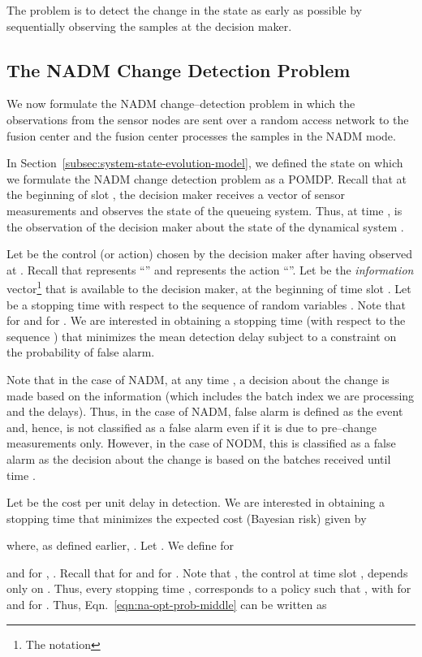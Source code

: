 \documentclass[acmtosn]{acmtrans2m}
\begin{document}
The problem is to detect the change in the state  as early as possible 
by sequentially observing the samples at the decision maker. 
\subsection{The NADM Change Detection Problem}
\label{subsec-the-NADM-change-detection-problem}
We now formulate the {\sf NADM} change--detection problem in which the observations 
from the sensor nodes are sent over a random access network to the fusion center 
and the fusion center processes the samples in the {\sf NADM} mode. 
 

In Section~\ref{subsec:system-state-evolution-model}, we defined the
state  on which we formulate
the {\sf NADM} change detection problem as a POMDP.
Recall that at the beginning of slot , the decision maker receives a vector of sensor 
measurements  and observes the state  of the queueing 
system. Thus, at time ,  is the 
observation of the decision maker about the state of the dynamical system .

Let  be the control 
(or action) chosen by the decision maker after having observed  
at . Recall that  represents ``'' and  
represents the action ``''. 
Let  be the {\em information} 
vector\footnote{The notation } 
that is available to the decision maker, at the beginning of time slot . 
Let  be a stopping time with respect to the sequence of random variables 
. 
Note that  for  and  for .
We are interested in obtaining a stopping time  (with respect to
the sequence ) that 
minimizes the mean detection delay subject to a constraint on the probability 
of false alarm. 

Note that in the case of NADM, at any time , a decision about the 
change is made based on the information  (which includes the
batch index we are processing and the delays). Thus, in the case of {\sf
NADM}, false alarm is defined as the event  and, hence,
 is not classified as a false alarm even if it is due to
pre--change measurements only. However, in the case of {\sf NODM},
this is classified as a false alarm as the
decision about the change is based on the batches received
until time . 

Let  be the cost per unit delay in detection. We are interested in 
obtaining a stopping time  that minimizes the expected cost
(Bayesian risk) given by

where, as defined earlier, .
Let \theta. We define for 

and for , . 
Recall that  for  and  for .
Note that , the control at time slot , depends only on .
Thus, every stopping time , corresponds to a policy 
 such that 
, with  for  and 
 for . Thus,  
Eqn.~\ref{eqn:na-opt-prob-middle} can be written as  
\end{document}
